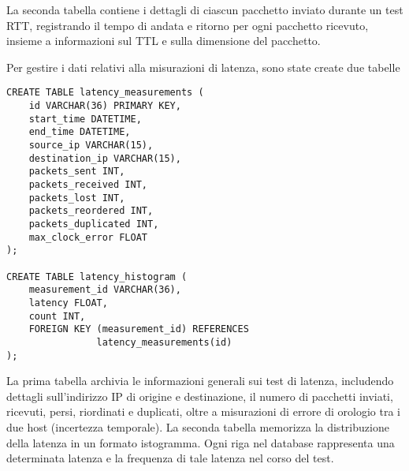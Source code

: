 \documentclass[12pt,a4paper]{report}
\begin{document}
La seconda  tabella contiene i dettagli di ciascun pacchetto inviato durante un test RTT, registrando il tempo di andata e ritorno per ogni pacchetto ricevuto, insieme a informazioni sul TTL e sulla dimensione del pacchetto.

Per gestire i dati relativi alla misurazioni di latenza, sono state create due tabelle
\begin{lstlisting}
CREATE TABLE latency_measurements (
    id VARCHAR(36) PRIMARY KEY,
    start_time DATETIME,
    end_time DATETIME,
    source_ip VARCHAR(15),
    destination_ip VARCHAR(15),
    packets_sent INT,
    packets_received INT,
    packets_lost INT,
    packets_reordered INT,
    packets_duplicated INT,
    max_clock_error FLOAT 
);

CREATE TABLE latency_histogram (
    measurement_id VARCHAR(36),
    latency FLOAT,
    count INT,
    FOREIGN KEY (measurement_id) REFERENCES 
                latency_measurements(id)
);    
\end{lstlisting}La prima tabella archivia le informazioni generali sui test di latenza, includendo dettagli sull'indirizzo IP di origine e destinazione, il numero di pacchetti inviati, ricevuti, persi, riordinati e duplicati, oltre a misurazioni di errore di orologio tra i due host (incertezza temporale).
La seconda tabella memorizza la distribuzione della latenza in un formato istogramma. Ogni riga nel database rappresenta una determinata latenza e la frequenza di tale latenza nel corso del test.
\end{document}
